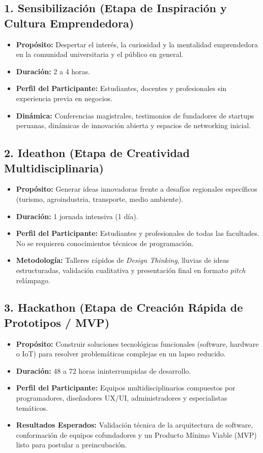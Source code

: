 ﻿\documentclass[12pt,a4paper]{article}
\begin{document}
\subsection{1. Sensibilización (Etapa de Inspiración y Cultura Emprendedora)}
\begin{itemize}[leftmargin=*]
    \item \textbf{Propósito:} Despertar el interés, la curiosidad y la mentalidad emprendedora en la comunidad universitaria y el público en general.
    \item \textbf{Duración:} 2 a 4 horas.
    \item \textbf{Perfil del Participante:} Estudiantes, docentes y profesionales sin experiencia previa en negocios.
    \item \textbf{Dinámica:} Conferencias magistrales, testimonios de fundadores de startups peruanas, dinámicas de innovación abierta y espacios de networking inicial.
\end{itemize}

\subsection{2. Ideathon (Etapa de Creatividad Multidisciplinaria)}
\begin{itemize}[leftmargin=*]
    \item \textbf{Propósito:} Generar ideas innovadoras frente a desafíos regionales específicos (turismo, agroindustria, transporte, medio ambiente).
    \item \textbf{Duración:} 1 jornada intensiva (1 día).
    \item \textbf{Perfil del Participante:} Estudiantes y profesionales de todas las facultades. No se requieren conocimientos técnicos de programación.
    \item \textbf{Metodología:} Talleres rápidos de \textit{Design Thinking}, lluvias de ideas estructuradas, validación cualitativa y presentación final en formato \textit{pitch} relámpago.
\end{itemize}

\subsection{3. Hackathon (Etapa de Creación Rápida de Prototipos / MVP)}
\begin{itemize}[leftmargin=*]
    \item \textbf{Propósito:} Construir soluciones tecnológicas funcionales (software, hardware o IoT) para resolver problemáticas complejas en un lapso reducido.
    \item \textbf{Duración:} 48 a 72 horas ininterrumpidas de desarrollo.
    \item \textbf{Perfil del Participante:} Equipos multidisciplinarios compuestos por programadores, diseñadores UX/UI, administradores y especialistas temáticos.
    \item \textbf{Resultados Esperados:} Validación técnica de la arquitectura de software, conformación de equipos cofundadores y un Producto Mínimo Viable (MVP) listo para postular a preincubación.
\end{itemize}
\end{document}
